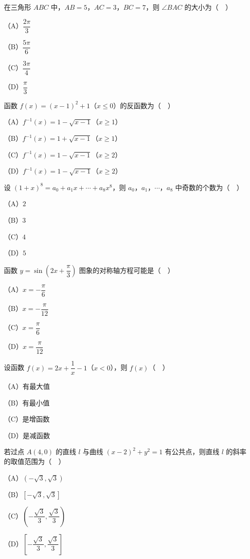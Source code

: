 \begin{question}
在三角形 $ABC$ 中，$AB=5$，$AC=3$，$BC=7$，则 $\angle BAC$ 的大小为（　）

（A）$\dfrac{2\pi}{3}$

（B）$\dfrac{5\pi}{6}$

（C）$\dfrac{3\pi}{4}$

（D）$\dfrac{\pi}{3}$

\end{question}
\begin{question}
函数 $f(x)=(x-1)^2+1$（$x\leqslant0$）的反函数为（　）

（A）$f^{-1}(x)=1-\sqrt{x-1}$（$x\geqslant1$）

（B）$f^{-1}(x)=1+\sqrt{x-1}$（$x\geqslant1$）

（C）$f^{-1}(x)=1-\sqrt{x-1}$（$x\geqslant2$）

（D）$f^{-1}(x)=1-\sqrt{x-1}$（$x\geqslant2$）

\end{question}
\begin{question}
设 $(1+x)^8=a_0+a_1x+\cdots+a_8x^8$，则 $a_0$，$a_1$，$\cdots$，$a_8$ 中奇数的个数为（　）

（A）$2$

（B）$3$

（C）$4$

（D）$5$

\end{question}
\begin{question}
函数 $y=\sin\left(2x+\dfrac{\pi}{3}\right)$ 图象的对称轴方程可能是（　）

（A）$x=-\dfrac{\pi}{6}$

（B）$x=-\dfrac{\pi}{12}$

（C）$x=\dfrac{\pi}{6}$

（D）$x=\dfrac{\pi}{12}$

\end{question}
\begin{question}
设函数 $f(x)=2x+\dfrac1x-1$（$x<0$），则 $f(x)$（　）

（A）有最大值

（B）有最小值

（C）是增函数

（D）是减函数

\end{question}
\begingroup
\renewenvironment{question}{\Needspace{0.46\textheight}}{}
\begin{question}
若过点 $A(4,0)$ 的直线 $l$ 与曲线 $(x-2)^2+y^2=1$ 有公共点，则直线 $l$ 的斜率的取值范围为（　）

（A）$(-\sqrt3,\sqrt3)$

（B）$[-\sqrt3,\sqrt3]$

（C）$\left(-\dfrac{\sqrt3}{3},\dfrac{\sqrt3}{3}\right)$

（D）$\left[-\dfrac{\sqrt3}{3},\dfrac{\sqrt3}{3}\right]$

\end{question}
